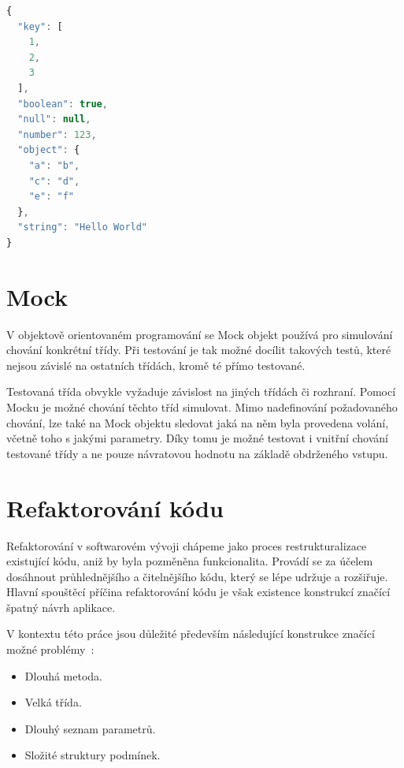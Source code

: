 \documentclass[thesis=B,czech]{FITthesis}[2012/06/26]
\begin{document}
\begin{lstlisting}[language=JavaScript, caption={Ukázka formátu JSON}]
{
  "key": [
    1,
    2,
    3
  ],
  "boolean": true,
  "null": null,
  "number": 123,
  "object": {
    "a": "b",
    "c": "d",
    "e": "f"
  },
  "string": "Hello World"
}
\end{lstlisting}

\section{Mock}
V objektově orientovaném programování se Mock objekt používá pro simulování chování konkrétní třídy.\cite{mock}
Při testování je tak možné docílit takových testů, které nejsou závislé na ostatních třídách, kromě té přímo testované.
\par
Testovaná třída obvykle vyžaduje závislost na jiných třídách či rozhraní. Pomocí Mocku je možné chování těchto tříd simulovat.
Mimo nadefinování požadovaného chování, lze také na Mock objektu sledovat jaká na něm byla provedena volání, včetně toho
s jakými parametry. Díky tomu je možné testovat i vnitřní chování testované třídy a ne pouze návratovou hodnotu na základě 
obdrženého vstupu.\cite{mock}

\section{Refaktorování kódu}
Refaktorování v softwarovém vývoji chápeme jako proces restrukturalizace existující kódu, aniž by byla 
pozměněna funkcionalita. Provádí se za účelem dosáhnout průhlednějšího a čitelnějšího kódu, který
se lépe udržuje a rozšiřuje. \cite{refaktoring} Hlavní spouštěcí příčina refaktorování kódu je však existence 
konstrukcí značící špatný návrh aplikace. 

V kontextu této práce jsou důležité především následující konstrukce značící možné problémy~\cite{refaktoring}:  
\begin{itemize}
\item Dlouhá metoda.
\item Velká třída.
\item Dlouhý seznam parametrů.
\item Složité struktury podmínek.
\end{itemize}
\end{document}
